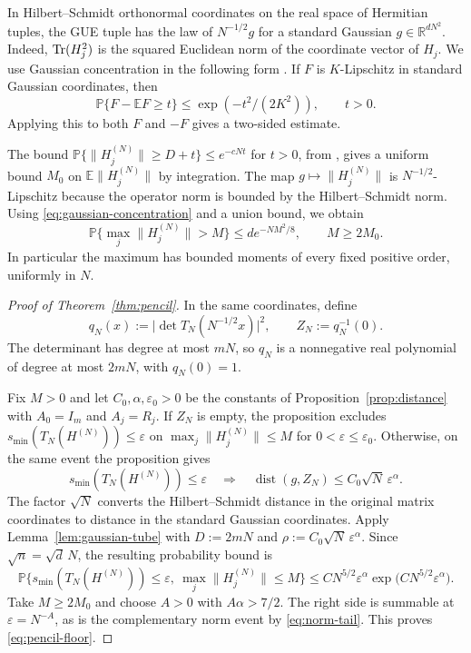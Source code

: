 In Hilbert--Schmidt orthonormal coordinates on the real space of Hermitian tuples, the GUE tuple has the law of \(N^{-1/2}g\) for a standard Gaussian \(g\in\mathbb R^{dN^2}\).
Indeed, \(\operatorname{Tr}(H_j^2)\) is the squared Euclidean norm of the coordinate vector of \(H_j\).
We use Gaussian concentration in the following form \cite[Proposition~4.4 of arXiv v1]{CGP22}.
If \(F\) is \(K\)-Lipschitz in standard Gaussian coordinates, then
\begin{equation}\label{eq:gaussian-concentration}
 \mathbb P\{F-\mathbb EF\ge t\}\le \exp(-t^2/(2K^2)),\qquad t>0.
\end{equation}
Applying this to both \(F\) and \(-F\) gives a two-sided estimate.

The bound \(\mathbb P\{\|H_j^{(N)}\|\ge D+t\}\le e^{-cNt}\) for \(t>0\), from \cite[Proposition~2.11 of arXiv v1]{CGP22}, gives a uniform bound \(M_0\) on \(\mathbb E\|H_j^{(N)}\|\) by integration.
The map \(g\mapsto\|H_j^{(N)}\|\) is \(N^{-1/2}\)-Lipschitz because the operator norm is bounded by the Hilbert--Schmidt norm.
Using \eqref{eq:gaussian-concentration} and a union bound, we obtain
\begin{equation}\label{eq:norm-tail}
 \mathbb P\{\max_j\|H_j^{(N)}\|>M\}\le d e^{-NM^2/8},
 \qquad M\ge 2M_0 .
\end{equation}
In particular the maximum has bounded moments of every fixed positive order, uniformly in \(N\).

\begin{proof}[Proof of Theorem~\ref{thm:pencil}]
In the same coordinates, define
\[
  q_N(x):=\bigl|\det T_N(N^{-1/2}x)\bigr|^2,
  \qquad Z_N:=q_N^{-1}(0).
\]
The determinant has degree at most \(mN\), so \(q_N\) is a nonnegative real polynomial of degree at most \(2mN\), with \(q_N(0)=1\).

Fix \(M>0\) and let \(C_0,\alpha,\varepsilon_0>0\) be the constants of Proposition~\ref{prop:distance} with \(A_0=I_m\) and \(A_j=R_j\).
If \(Z_N\) is empty, the proposition excludes \(s_{\min}(T_N(H^{(N)}))\le\varepsilon\) on \(\max_j\|H_j^{(N)}\|\le M\) for \(0<\varepsilon\le\varepsilon_0\).
Otherwise, on the same event the proposition gives
\[
  s_{\min}(T_N(H^{(N)}))\le\varepsilon
  \quad\Longrightarrow\quad
  \operatorname{dist}(g,Z_N)\le C_0\sqrt N\,\varepsilon^\alpha.
\]
The factor \(\sqrt N\) converts the Hilbert--Schmidt distance in the original matrix coordinates to distance in the standard Gaussian coordinates.
Apply Lemma~\ref{lem:gaussian-tube} with \(D:=2mN\) and \(\rho:=C_0\sqrt N\,\varepsilon^\alpha\).
Since \(\sqrt n=\sqrt d\,N\), the resulting probability bound is
\[
  \mathbb P\bigl\{s_{\min}(T_N(H^{(N)}))\le\varepsilon,\
                 \max_j\|H_j^{(N)}\|\le M\bigr\}
  \le C N^{5/2}\varepsilon^\alpha
      \exp\bigl(CN^{5/2}\varepsilon^\alpha\bigr).
\]
Take \(M\ge 2M_0\) and choose \(A>0\) with \(A\alpha>7/2\).
The right side is summable at \(\varepsilon=N^{-A}\), as is the complementary norm event by \eqref{eq:norm-tail}.
This proves \eqref{eq:pencil-floor}.
\end{proof}
